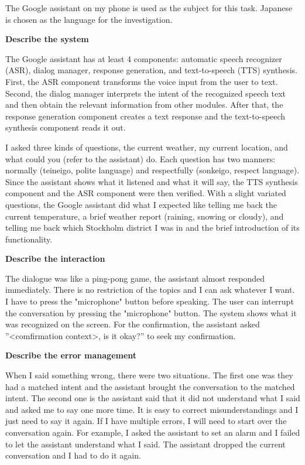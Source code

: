 \documentclass[12pt]{article}
\newenvironment{problem}[2][Problem]{\begin{trivlist}
\item[\hskip \labelsep {\bfseries #1}\hskip \labelsep {\bfseries #2.}]}{\end{trivlist}}
\begin{document}
\begin{problem}{3.3}
    The Google assistant on my phone is used as the subject for this task.
    Japanese is chosen as the language for the investigation.

\noindent\textbf{Describe the system}

    The Google assistant has at least 4 components: automatic speech recognizer 
    (ASR), dialog manager, response generation, and text-to-speech (TTS) synthesis. 
    First, the ASR component transforms the voice input from the user to text. 
    Second, the dialog manager interprets the intent of the recognized speech 
    text and then obtain the relevant information from other modules. 
    After that, the response generation component creates a text response and 
    the text-to-speech synthesis component reads it out.

    I asked three kinds of questions, the current weather, my current location, 
    and what could you (refer to the assistant) do. 
    Each question has two manners: normally (teineigo, polite language) and 
    respectfully (sonkeigo, respect language). 
    Since the assistant shows what it listened and what it will say, 
    the TTS synthesis component and the ASR component were then verified. 
    With a slight variated questions, the Google assistant did what I expected 
    like telling me back the current temperature, 
    a brief weather report (raining, snowing or cloudy), and telling me back 
    which Stockholm district I was in and the brief introduction of its functionality.

\noindent\textbf{Describe the interaction}

    The dialogue was like a ping-pong game, the assistant almost responded immediately.
    There is no restriction of the topics and I can ask whatever I want. 
    I have to press the "microphone" button before speaking. 
    The user can interrupt the conversation by pressing the "microphone" button.
    The system shows what it was recognized on the screen. 
    For the confirmation, the assistant asked ”<comfirmation context>, is it okay?” 
    to seek my confirmation.

\noindent\textbf{Describe the error management}

    When I said something wrong, there were two situations. 
    The first one was they had a matched intent and the assistant brought 
    the conversation to the matched intent. 
    The second one is the assistant said that it did not understand what I said 
    and asked me to say one more time. 
    It is easy to correct misunderstandings and I just need to say it again.
    If I have multiple errors, I will need to start over the conversation again.
    For example, I asked the assistant to set an alarm and I failed to let the 
    assistant understand what I said. 
    The assistant dropped the current conversation and I had to do it again.


\end{problem}
\end{document}

